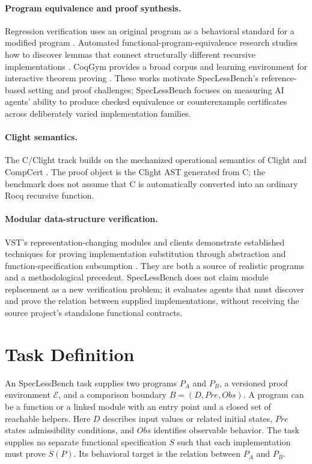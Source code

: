 \documentclass{article}
\begin{document}
\paragraph{Program equivalence and proof synthesis.}
Regression verification uses an original program as a behavioral standard for a modified program \citep{godlin2013regression}. Automated functional-program-equivalence research studies how to discover lemmas that connect structurally different recursive implementations \citep{sun2025directed}. CoqGym provides a broad corpus and learning environment for interactive theorem proving \citep{yang2019coqgym}. These works motivate SpecLessBench's reference-based setting and proof challenges; SpecLessBench focuses on measuring AI agents' ability to produce checked equivalence or counterexample certificates across deliberately varied implementation families.

\paragraph{Clight semantics.}
The C/Clight track builds on the mechanized operational semantics of Clight \citep{blazy2009clight} and CompCert \citep{leroy2009compcert}. The proof object is the Clight AST generated from C; the benchmark does not assume that C is automatically converted into an ordinary Rocq recursive function.

\paragraph{Modular data-structure verification.}
VST's representation-changing modules and clients demonstrate established techniques for proving implementation substitution through abstraction and function-specification subsumption \citep{beringer2019abstraction,vst2026source}. They are both a source of realistic programs and a methodological precedent. SpecLessBench does not claim module replacement as a new verification problem; it evaluates agents that must discover and prove the relation between supplied implementations, without receiving the source project's standalone functional contracts.

\section{Task Definition}

An SpecLessBench task supplies two programs $P_A$ and $P_B$, a versioned proof environment $\mathcal{E}$, and a comparison boundary $B=(D,\mathit{Pre},\mathit{Obs})$. A program can be a function or a linked module with an entry point and a closed set of reachable helpers. Here $D$ describes input values or related initial states, $\mathit{Pre}$ states admissibility conditions, and $\mathit{Obs}$ identifies observable behavior. The task supplies no separate functional specification $S$ such that each implementation must prove $S(P)$. Its behavioral target is the relation between $P_A$ and $P_B$.
\end{document}
